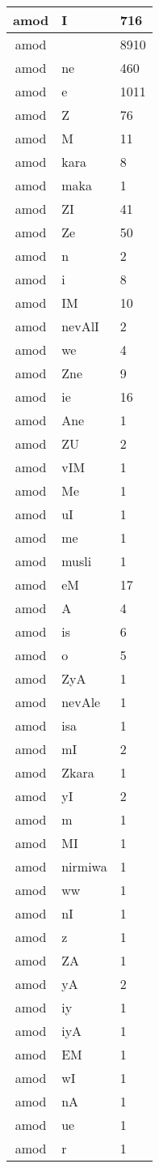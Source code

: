 \documentclass[a4 paper]{article}
\begin{document}
\begin{longtable}{cp{}p{}}
amod & I & 716\\ \midrule amod &  & 8910\\ \midrule amod & ne & 460\\ \midrule amod & e & 1011\\ \midrule amod & Z & 76\\ \midrule amod & M & 11\\ \midrule amod & kara & 8\\ \midrule amod & maka & 1\\ \midrule amod & ZI & 41\\ \midrule amod & Ze & 50\\ \midrule amod & n & 2\\ \midrule amod & i & 8\\ \midrule amod & IM & 10\\ \midrule amod & nevAlI & 2\\ \midrule amod & we & 4\\ \midrule amod & Zne & 9\\ \midrule amod & ie & 16\\ \midrule amod & Ane & 1\\ \midrule amod & ZU & 2\\ \midrule amod & vIM & 1\\ \midrule amod & Me & 1\\ \midrule amod & uI & 1\\ \midrule amod & me & 1\\ \midrule amod & musli & 1\\ \midrule amod & eM & 17\\ \midrule amod & A & 4\\ \midrule amod & is & 6\\ \midrule amod & o & 5\\ \midrule amod & ZyA & 1\\ \midrule amod & nevAle & 1\\ \midrule amod & isa & 1\\ \midrule amod & mI & 2\\ \midrule amod & Zkara & 1\\ \midrule amod & yI & 2\\ \midrule amod & m & 1\\ \midrule amod & MI & 1\\ \midrule amod & nirmiwa & 1\\ \midrule amod & ww & 1\\ \midrule amod & nI & 1\\ \midrule amod & z & 1\\ \midrule amod & ZA & 1\\ \midrule amod & yA & 2\\ \midrule amod & iy & 1\\ \midrule amod & iyA & 1\\ \midrule amod & EM & 1\\ \midrule amod & wI & 1\\ \midrule amod & nA & 1\\ \midrule amod & ue & 1\\ \midrule amod & r & 1\\ \midrule 

\end{longtable}
\end{document}
